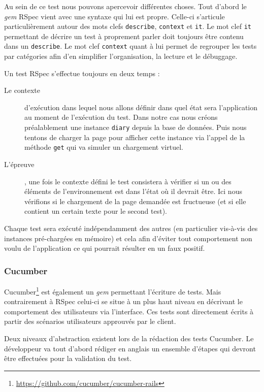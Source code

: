 \documentclass[12pt,a4paper]{book}
\begin{document}
Au sein de ce test nous pouvons apercevoir différentes choses. Tout d'abord le \textit{gem} RSpec vient avec une syntaxe qui lui est propre. Celle-ci s'articule particulièrement autour des mots clefs \texttt{describe}, \texttt{context} et \texttt{it}. Le mot clef \texttt{it} permettant de décrire un test à proprement parler doit toujours être contenu dans un \texttt{describe}. Le mot clef \texttt{context} quant à lui permet de regrouper les tests par catégories afin d'en simplifier l'organisation, la lecture et le débuggage.

Un test RSpec s'effectue toujours en deux temps :
\begin{description}
	\item[Le contexte] d'exécution dans lequel nous allons définir dans quel état sera l'application au moment de l'exécution du test. Dans notre cas nous créons préalablement une instance \texttt{diary} depuis la base de données. Puis nous tentons de charger la page pour afficher cette instance via l'appel de la méthode \texttt{get} qui va simuler un chargement virtuel.
	\item[L'épreuve], une fois le contexte défini le test consistera à vérifier si un ou des éléments de l'environnement est dans l'état où il devrait être. Ici nous vérifions si le chargement de la page demandée est fructueuse (et si elle contient un certain texte pour le second test).
\end{description}

Chaque test sera exécuté indépendamment des autres (en particulier vis-à-vis des instances pré-chargées en mémoire) et cela afin d'éviter tout comportement non voulu de l'application ce qui pourrait résulter en un faux positif.

\subsubsection{Cucumber}

Cucumber\footnote{\url{https://github.com/cucumber/cucumber-rails}} est également un \textit{gem} permettant l'écriture de tests. Mais contrairement à RSpec celui-ci se situe à un plus haut niveau en décrivant le comportement des utilisateurs via l'interface. Ces tests sont directement écrits à partir des scénarios utilisateurs approuvés par le client.

Deux niveaux d'abstraction existent lors de la rédaction des tests Cucumber. Le développeur va tout d'abord rédiger en anglais un ensemble d'étapes qui devront être effectuées pour la validation du test.
\end{document}
